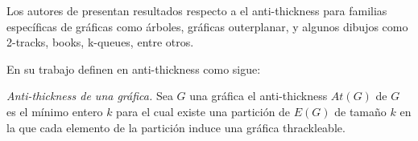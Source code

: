 
%
%

%
Los autores de \cite{Dujmovic2017} presentan resultados respecto a el
anti-thickness para familias específicas de gráficas como árboles, gráficas
outerplanar, y algunos dibujos como 2-tracks, books, k-queues, entre otros.

En su trabajo definen en anti-thickness como sigue:
\begin{definition}{\emph{Anti-thickness de una gráfica.}}
Sea $G$ una gráfica el anti-thickness $At(G)$ de $G$ es el mínimo entero $k$
para el cual existe una partición de $E(G)$ de tamaño $k$
en la que cada elemento de la partición induce una gráfica thrackleable.
\end{definition}

